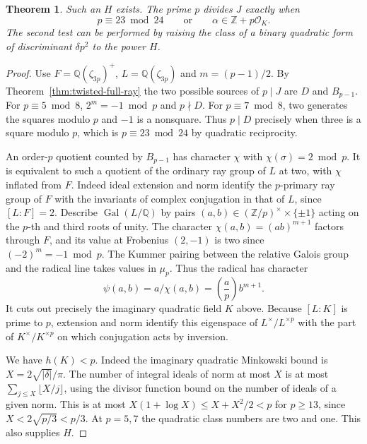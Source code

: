 \documentclass[11pt]{article}
\newtheorem{theorem}{Theorem}
\begin{document}
\begin{theorem}\label{thm:twisted-conductor-prime}
Such an \(H\) exists. The prime \(p\) divides \(J\) exactly when
\[
       p\equiv23\bmod24
       \qquad\text{or}\qquad
       \alpha\in\mathbb Z+p\mathcal O_K .
\]
The second test can be performed by raising the class of a binary
quadratic form of discriminant \(\delta p^2\) to the power \(H\).
\end{theorem}
\begin{proof}
Use \(F=\mathbb Q(\zeta_{3p})^+\), \(L=\mathbb Q(\zeta_{3p})\)
and \(m=(p-1)/2\). By Theorem~\ref{thm:twisted-full-ray} the two
possible sources of \(p\mid J\) are \(D\) and \(B_{p-1}\). For
\(p\equiv5\bmod8\), \(2^m=-1\bmod p\) and \(p\nmid D\). For
\(p\equiv7\bmod8\), two generates the squares modulo \(p\) and
\(-1\) is a nonsquare. Thus \(p\mid D\) precisely when three is
a square modulo \(p\), which is \(p\equiv23\bmod24\) by quadratic
reciprocity.

An order-\(p\) quotient counted by \(B_{p-1}\) has character
\(\chi\) with \(\chi(\sigma)=2\bmod p\). It is equivalent to
such a quotient of the ordinary ray group of \(L\) at two, with
\(\chi\) inflated from \(F\). Indeed ideal extension and norm
identify the \(p\)-primary ray group of \(F\) with the invariants
of complex conjugation in that of \(L\), since \([L:F]=2\).
Describe \(\operatorname{Gal}(L/\mathbb Q)\) by pairs
\((a,b)\in(\mathbb Z/p)^\times\times\{\pm1\}\) acting on the
\(p\)-th and third roots of unity. The character
\(\chi(a,b)=(ab)^{m+1}\) factors through \(F\), and its value at
Frobenius \((2,-1)\) is two since \((-2)^m=-1\bmod p\).
The Kummer pairing between the relative Galois group and the
radical line takes values in \(\mu_p\). Thus the radical has
character
\[
         \psi(a,b)=a/\chi(a,b)=\left(\frac ap\right)b^{m+1}.
\]
It cuts out precisely the imaginary quadratic field \(K\) above.
Because \([L:K]\) is prime to \(p\), extension and norm identify
this eigenspace of \(L^\times/L^{\times p}\) with the part of
\(K^\times/K^{\times p}\) on which conjugation acts by inversion.

We have \(h(K)<p\). Indeed the imaginary quadratic Minkowski bound
is \(X=2\sqrt{|\delta|}/\pi\). The number of integral ideals of norm at
most \(X\) is at most \(\sum_{j\le X}\lfloor X/j\rfloor\),
using the divisor function bound on the number of ideals of a
given norm. This is at most \(X(1+\log X)\le X+X^2/2<p\) for
\(p\ge13\), since \(X<2\sqrt{p/3}<p/3\). At \(p=5,7\) the
quadratic class numbers are two and one. This also supplies \(H\).


\end{proof}
\end{document}

